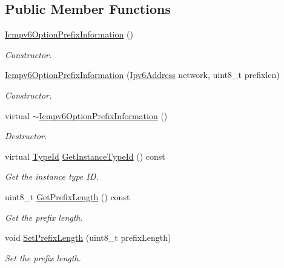\subsection*{Public Member Functions}
\begin{DoxyCompactItemize}
\item 
\hyperlink{classns3_1_1Icmpv6OptionPrefixInformation_af00f692785603d8308053899b17a738c}{Icmpv6\+Option\+Prefix\+Information} ()
\begin{DoxyCompactList}\small\item\em Constructor. \end{DoxyCompactList}\item 
\hyperlink{classns3_1_1Icmpv6OptionPrefixInformation_ab30f2112400543719b3e827137360932}{Icmpv6\+Option\+Prefix\+Information} (\hyperlink{classns3_1_1Ipv6Address}{Ipv6\+Address} network, uint8\+\_\+t prefixlen)
\begin{DoxyCompactList}\small\item\em Constructor. \end{DoxyCompactList}\item 
virtual \hyperlink{classns3_1_1Icmpv6OptionPrefixInformation_a292ac509c78ca9e837c6f19d438a4180}{$\sim$\+Icmpv6\+Option\+Prefix\+Information} ()
\begin{DoxyCompactList}\small\item\em Destructor. \end{DoxyCompactList}\item 
virtual \hyperlink{classns3_1_1TypeId}{Type\+Id} \hyperlink{classns3_1_1Icmpv6OptionPrefixInformation_a073eb12214769ed85eca05ba21d94dc6}{Get\+Instance\+Type\+Id} () const 
\begin{DoxyCompactList}\small\item\em Get the instance type ID. \end{DoxyCompactList}\item 
uint8\+\_\+t \hyperlink{classns3_1_1Icmpv6OptionPrefixInformation_aa62790c1b73ebb4430cf29c74126ee53}{Get\+Prefix\+Length} () const 
\begin{DoxyCompactList}\small\item\em Get the prefix length. \end{DoxyCompactList}\item 
void \hyperlink{classns3_1_1Icmpv6OptionPrefixInformation_a8ff2a9422e79f88f79dc430a0740fa4f}{Set\+Prefix\+Length} (uint8\+\_\+t prefix\+Length)
\begin{DoxyCompactList}\small\item\em Set the prefix length. \end{DoxyCompactList}\item 

\end{DoxyCompactItemize}
